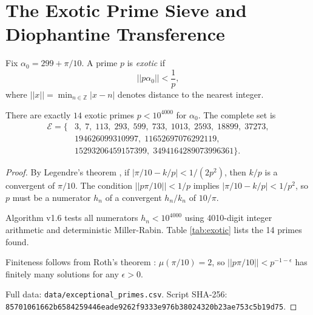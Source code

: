 
\section{The Exotic Prime Sieve and Diophantine Transference}
\label{app:exotic}

\begin{definition}
\label{def:Invariant-sieve}
Fix $\alpha_0 = 299 + \pi/10$. A prime $p$ is \textit{exotic} if
$$
||p\alpha_0|| < \frac{1}{p},
$$
where $||x|| = \min_{n\in\mathbb{Z}}|x-n|$ denotes distance to the nearest integer.
\end{definition}

\begin{theorem}
\label{thm:exotic-enumeration}
There are exactly $14$ exotic primes $p < 10^{4000}$ for $\alpha_0$. The complete set is
\begin{align*}
\mathcal{E} = \{ &3,\; 7,\; 113,\; 293,\; 599,\; 733,\; 1013,\; 2593,\; 18899,\; 37273, \\
&194626099310997,\; 11652697076292119,\; \\
&15293206459157399,\; 3494164289073996361 \}.
\end{align*}
\end{theorem}

\begin{proof}
By Legendre's theorem \cite{Legendre1798}, if $|\pi/10 - k/p| < 1/(2p^2)$, then $k/p$ is a convergent of $\pi/10$. The condition $||p\pi/10|| < 1/p$ implies $|\pi/10 - k/p| < 1/p^2$, so $p$ must be a numerator $h_n$ of a convergent $h_n/k_n$ of $10/\pi$. 

Algorithm v1.6 \cite{Fox2026} tests all numerators $h_n < 10^{4000}$ using 4010-digit integer arithmetic and deterministic Miller-Rabin. Table \ref{tab:exotic} lists the 14 primes found. 

Finiteness follows from Roth's theorem \cite{Roth1955}: $\mu(\pi/10) = 2$, so $||p\pi/10|| < p^{-1-\epsilon}$ has finitely many solutions for any $\epsilon > 0$.

Full data: \texttt{data/exceptional\_primes.csv}. 
Script SHA-256: \texttt{85701061662b6584259446eade9262f9333e976b38024320b23ae753c5b19d75}.
\end{proof}

